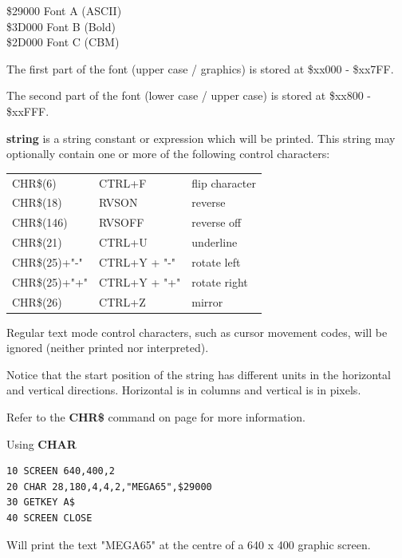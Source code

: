\begin{description}[leftmargin=2cm,style=nextline]
                \$29000 Font A (ASCII) \\
                \$3D000 Font B (Bold)  \\
                \$2D000 Font C (CBM)

                The first part of the font (upper case / graphics) is stored at \$xx000 - \$xx7FF.

                The second part of the font (lower case / upper case) is stored at \$xx800 - \$xxFFF.

                {\bf string} is a string constant or expression
                which will be printed. This string may optionally contain
                one or more of the following control characters:

               \begin{center}
               {\setlength{\tabcolsep}{1mm}
                \ttfamily
                \begin{tabular}{|l|l|l|}
                  \hline
                     CHR\$(6)       &  CTRL+F         &  flip character \\
                     CHR\$(18)      &  RVSON          &  reverse  \\
                     CHR\$(146)     &  RVSOFF         &  reverse off \\
                     CHR\$(21)      &  CTRL+U         &  underline\\
                     CHR\$(25)+"-"  &  CTRL+Y + "-"   &  rotate left\\
                     CHR\$(25)+"+"  &  CTRL+Y + "+"   &  rotate right\\
                     CHR\$(26)      &  CTRL+Z         &  mirror\\
                  \hline
                  \end{tabular}
                }
                \end{center}
\item [Remarks:]
                Regular text mode control characters,
                such as cursor movement codes, will be ignored
                (neither printed nor interpreted).

                Notice that the start position of the string has
                different units in the horizontal and vertical directions.
                Horizontal is in columns and vertical is in pixels.

                Refer to the {\bf CHR\$} command on page \pageref{chrcommand}
                for more information.

\item [Example:] Using {\bf CHAR}
\begin{tcolorbox}[colback=black,coltext=white]
\verbatimfont{\codefont}
\begin{verbatim}
10 SCREEN 640,400,2
20 CHAR 28,180,4,4,2,"MEGA65",$29000
30 GETKEY A$
40 SCREEN CLOSE
\end{verbatim}
\end{tcolorbox}
Will print the text "MEGA65" at the centre of a 640 x 400 graphic screen.
\end{description}

